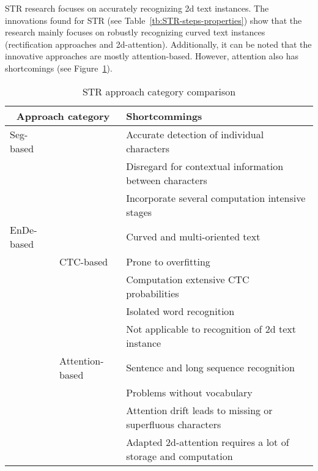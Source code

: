\ac{STR} research focuses on accurately recognizing 2d text instances.
The innovations found for \ac{STR} (see Table~\ref{tb:STR-steps-properties}) show that the research
mainly focuses on robustly recognizing curved text instances (rectification approaches and
2d-attention).
Additionally, it can be noted that the innovative approaches are mostly attention-based.
However, attention also has shortcomings (see Figure~\ref{tb:STR-comparison}).
\begin{table}[h]
    \centering\scriptsize
    \begin{tabular}{p{}p{}p{}}
        \multicolumn{2}{c}{\textbf{Approach category}} & \textbf{Shortcommings} \\
        \toprule
        Seg-based & & Accurate detection of individual
                        characters~\citep{chen_text_2021,cheng_aon_2018} \\
        & & Disregard for contextual information between characters~\citep{chen_text_2021} \\
        & & Incorporate several computation intensive stages~\citep{liu_abcnet_2020} \\
        \midrule
        \ac{EnDe}-based & & Curved and multi-oriented text~\citep{cheng_aon_2018, long_scene_2021} \\
        & CTC-based & Prone to overfitting~\citep{chen_text_2021} \\
        & & Computation extensive CTC probabilities~\citep{xie_aggregation_2019} \\
        & & Isolated word recognition~\citep{cong_comparative_2019} \\
        & & Not applicable to recognition of 2d text instance~\citep{cheng_focusing_2017,
            xie_aggregation_2019,chen_text_2021} \\
        & Attention-based & Sentence and long sequence
            recognition~\citep{cong_comparative_2019,chen_text_2021} \\
        & & Problems without vocabulary~\citep{wan_vocabulary_2020} \\
        & & Attention drift leads to missing or superfluous
            characters~\citep{liao_scene_2018,xie_aggregation_2019,chen_text_2021}\\
        & & Adapted 2d-attention requires a lot of storage and
            computation~\citep{xie_aggregation_2019,chen_text_2021} \\
        \bottomrule
    \end{tabular}
    \caption{STR approach category comparison\label{tb:STR-comparison}}
\end{table}
